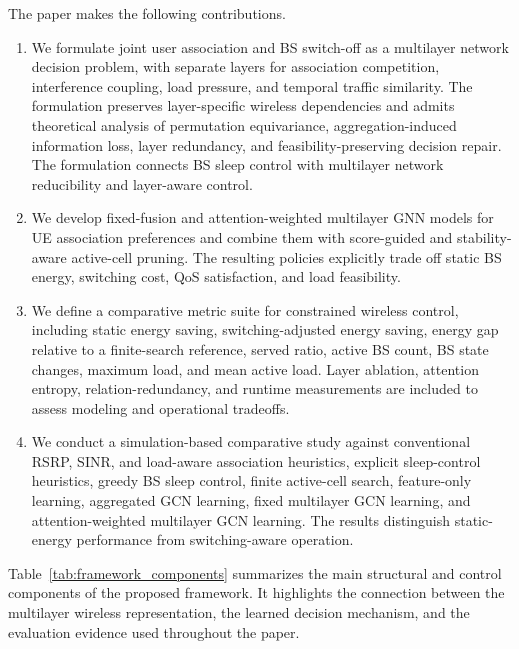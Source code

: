 \documentclass[journal]{IEEEtran}
\begin{document}
The paper makes the following contributions.
\begin{enumerate}
    \item We formulate joint user association and BS switch-off as a multilayer
    network decision problem, with separate layers for association competition,
    interference coupling, load pressure, and temporal traffic similarity.
    The formulation preserves layer-specific wireless dependencies and admits
    theoretical analysis of permutation equivariance, aggregation-induced
    information loss, layer redundancy, and feasibility-preserving decision
    repair. The formulation connects BS sleep control with multilayer network
    reducibility and layer-aware control.

    \item We develop fixed-fusion and attention-weighted multilayer GNN models
    for UE association preferences and combine them with score-guided and
    stability-aware active-cell pruning. The resulting policies explicitly
    trade off static BS energy, switching cost, QoS satisfaction, and load
    feasibility.

    \item We define a comparative metric suite for constrained wireless
    control, including static energy saving, switching-adjusted energy saving,
    energy gap relative to a finite-search reference, served ratio, active BS
    count, BS state changes, maximum load, and mean active load. Layer
    ablation, attention entropy, relation-redundancy, and runtime measurements
    are included to assess modeling and operational tradeoffs.

    \item We conduct a simulation-based comparative study against conventional
    RSRP, SINR, and load-aware association heuristics, explicit sleep-control
    heuristics, greedy BS sleep control, finite active-cell search,
    feature-only learning, aggregated GCN learning, fixed multilayer GCN
    learning, and attention-weighted multilayer GCN learning. The results
    distinguish static-energy performance from switching-aware operation.
\end{enumerate}

Table~\ref{tab:framework_components} summarizes the main structural and
control components of the proposed framework. It highlights the connection
between the multilayer wireless representation, the learned decision mechanism,
and the evaluation evidence used throughout the paper.
\end{document}
